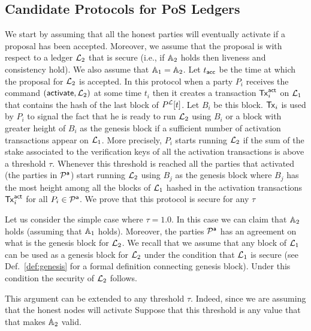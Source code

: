 \subsection{Candidate Protocols for PoS Ledgers}
We start by assuming that all the honest parties will eventually activate if a proposal has been accepted. Moreover, we assume that the proposal is with
respect to a ledger $\mathcal{L}_2$ that is secure (i.e., if $\mathbb{A}_2$ holds then liveness and consistency hold). We also assume that $\mathbb{A}_1=\mathbb{A}_2$. Let $t_{\mathsf{acc}}$ be the time at which the proposal 
for $\mathcal{L}_2$ is accepted.
In this protocol when a party $P_i$ receives the command $(\mathsf{activate}, \mathcal{L}_2)$ at some time $t_i$ then it creates a transaction $\mathsf{Tx}^\mathsf{act}_i$ on $\mathcal{L}_1$ that contains the hash of the last block of $P^{\mathcal{L}}[t]$. Let $B_i$ be this block. $\mathsf{Tx}_i$ is used by $P_i$ to signal the fact that he is ready to run $\mathcal{L}_2$ using $B_i$ or a block
with greater height of $B_i$ as the genesis block if a sufficient number of activation transactions appear on $\mathcal{L}_1$. 
More precisely, $P_i$ starts running $\mathcal{L}_2$ if the sum of the stake associated to the
verification keys of all the activation transactions is above a threshold $\tau$. Whenever this threshold is reached all the parties that activated (the parties in $\mathcal{P}^\mathsf{a}$)
start running $\mathcal{L}_2$ using $B_j$ as the genesis block where $B_j$ has the most height among all the blocks of $\mathcal{L}_1$ hashed in the activation transactions $\mathsf{Tx}^\mathsf{act}_i$
for all $P_i\in\mathcal{P}^\mathsf{a}$.
We prove that this protocol is secure for any $\tau$ 

Let us consider the simple case where $\tau=1.0$. In this case we can claim that $\mathbb{A}_2$ holds (assuming that $\mathbb{A}_1$ holds).
Moreover, the parties $\mathcal{P}^\mathsf{a}$ has an agreement on what is the genesis block for $\mathcal{L}_2$. We recall that we assume that any block of $\mathcal{L}_1$ can be used as
a genesis block for $\mathcal{L}_2$ under the condition that $\mathcal{L}_1$ is secure (see Def.~\ref{def:genesis} for a formal definition connecting genesis block).
Under this condition the security of $\mathcal{L}_2$  follows. 

 
This argument can be extended to any threshold $\tau$. Indeed, since we are assuming that the honest nodes will activate
Suppose that this threshold is any value that that makes $\mathbb{A}_2$ valid.

